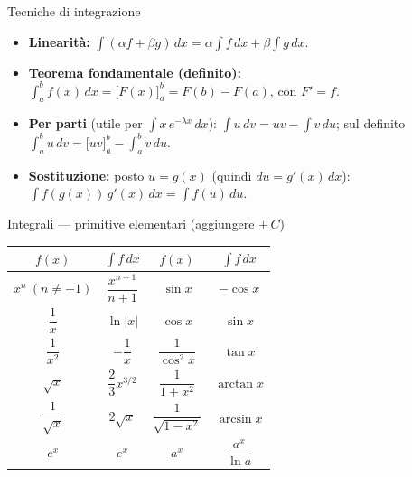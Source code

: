 \documentclass[11pt]{article}
\begin{document}
\newpage
\begin{concetto}[barSlate]{Tecniche di integrazione}
\begin{itemize}[leftmargin=1.3em,itemsep=4pt,topsep=2pt]
\item \textbf{Linearit\`a:} $\displaystyle\int (\alpha f + \beta g)\,dx = \alpha\!\int f\,dx + \beta\!\int g\,dx$.
\item \textbf{Teorema fondamentale (definito):} $\displaystyle\int_a^b f(x)\,dx = \big[F(x)\big]_a^b = F(b)-F(a)$, con $F'=f$.
\item \textbf{Per parti} (utile per $\int x\,e^{-\lambda x}\,dx$): $\displaystyle\int u\,dv = uv - \int v\,du$; \; sul definito $\displaystyle\int_a^b u\,dv = \big[uv\big]_a^b - \int_a^b v\,du$.
\item \textbf{Sostituzione:} posto $u=g(x)$ (quindi $du=g'(x)\,dx$): $\displaystyle\int f(g(x))\,g'(x)\,dx = \int f(u)\,du$.
\end{itemize}
\end{concetto}

\begin{concetto}[barSlate]{Integrali --- primitive elementari (aggiungere $+\,C$)}
\renewcommand{\arraystretch}{1.9}
\begin{center}
\begin{tabular}{c|c@{\hskip 3em}c|c}
$f(x)$ & $\displaystyle\int f\,dx$ & $f(x)$ & $\displaystyle\int f\,dx$ \\
\hline
$x^n\ (n\neq-1)$ & $\dfrac{x^{n+1}}{n+1}$ & $\sin x$ & $-\cos x$ \\
$\dfrac{1}{x}$ & $\ln|x|$ & $\cos x$ & $\sin x$ \\
$\dfrac{1}{x^2}$ & $-\dfrac{1}{x}$ & $\dfrac{1}{\cos^2 x}$ & $\tan x$ \\
$\sqrt{x}$ & $\dfrac{2}{3}x^{3/2}$ & $\dfrac{1}{1+x^2}$ & $\arctan x$ \\
$\dfrac{1}{\sqrt{x}}$ & $2\sqrt{x}$ & $\dfrac{1}{\sqrt{1-x^2}}$ & $\arcsin x$ \\
$e^{x}$ & $e^{x}$ & $a^{x}$ & $\dfrac{a^{x}}{\ln a}$ \\
\end{tabular}
\end{center}
\renewcommand{\arraystretch}{1}
\end{concetto}
\end{document}
